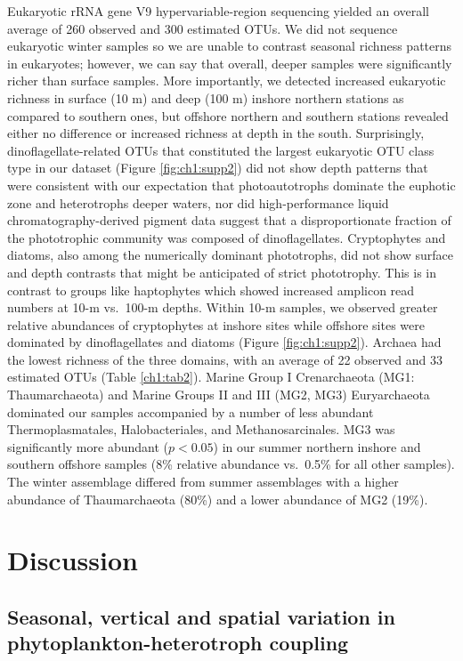 Eukaryotic rRNA gene V9 hypervariable-region sequencing yielded an overall average of 260 observed and 300 estimated OTUs. We did not sequence eukaryotic winter samples so we are unable to contrast seasonal richness patterns in eukaryotes; however, we can say that overall, deeper samples were significantly richer than surface samples. More importantly, we detected increased eukaryotic richness in surface (10 m) and deep (100 m) inshore northern stations as compared to southern ones, but offshore northern and southern stations revealed either no difference or increased richness at depth in the south. Surprisingly, dinoflagellate-related OTUs that constituted the largest eukaryotic OTU class type in our dataset (Figure \ref{fig:ch1:supp2}) did not show depth patterns that were consistent with our expectation that photoautotrophs dominate the euphotic zone and heterotrophs deeper waters, nor did high-performance liquid chromatography-derived pigment data suggest that a disproportionate fraction of the phototrophic community was composed of dinoflagellates. Cryptophytes and diatoms, also among the numerically dominant phototrophs, did not show surface and depth contrasts that might be anticipated of strict phototrophy. This is in contrast to groups like haptophytes which showed increased amplicon read numbers at 10-m vs.~100-m depths. Within 10-m samples, we observed greater relative abundances of cryptophytes at inshore sites while offshore sites were dominated by dinoflagellates and diatoms (Figure \ref{fig:ch1:supp2}). Archaea had the lowest richness of the three domains, with an average of 22 observed and 33 estimated OTUs (Table \ref{ch1:tab2}). Marine Group I Crenarchaeota (MG1: Thaumarchaeota) and Marine Groups II and III (MG2, MG3) Euryarchaeota dominated our samples accompanied by a number of less abundant Thermoplasmatales, Halobacteriales, and Methanosarcinales. MG3 was significantly more abundant ($p<0.05$) in our summer northern inshore and southern offshore samples (8\% relative abundance vs.~0.5\% for all other samples). The winter assemblage differed from summer assemblages with a higher abundance of Thaumarchaeota (80\%) and a lower abundance of MG2 (19\%).



\section{Discussion}\label{sc:discussion}

\subsection{Seasonal, vertical and spatial variation in phytoplankton-heterotroph coupling}\label{ssc:seasonal}


